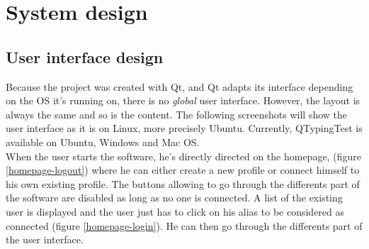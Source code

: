 \part{System design}

\chapter{User interface design}
Because the project was created with Qt, and Qt adapts its interface depending on the OS it's running on, there is no \textit{global} user interface. However, the layout is always the same and so is the content. The following screenshots will show the user interface as it is on Linux, more precisely Ubuntu. Currently, QTypingTest is available on Ubuntu, Windows and Mac OS.\\
When the user starts the software, he's directly directed on the homepage, (figure \ref{homepage-logout}) where he can either create a new profile or connect himself to his own existing profile. The buttons allowing to go through the differents part of the software are disabled as long as no one is connected. A list of the existing user is displayed and the user just has to click on his alias to be considered as connected (figure \ref{homepage-login}). He can then go through the differents part of the user interface. 
